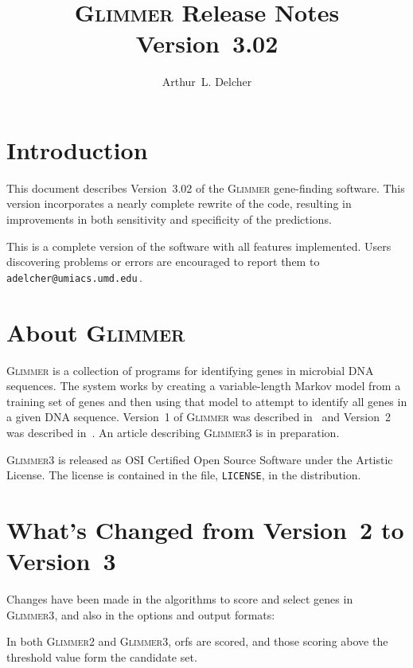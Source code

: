 \documentclass[fleqn,titlepage,11pt]{article}
\def\Glimmer{\textsc{Glimmer}}
\def\Gtwo{\textsc{Glimmer2}}
\def\Gthree{\textsc{Glimmer3}}
\def\Pg#1{\texttt{#1}}
\begin{document}
\RaggedRight
\sloppy

\title{\Glimmer{} Release Notes \\ Version~3.02}
\author{Arthur~L. Delcher}

\maketitle


\section{Introduction}

This document describes Version~3.02 of the \Glimmer{}
gene-finding software.  This version incorporates
a nearly complete rewrite of the code, resulting in
improvements in both sensitivity and specificity of
the predictions.

This is a complete version of the software with
all features implemented.  Users discovering
problems or errors are encouraged to report them to
\,\verb`adelcher@umiacs.umd.edu`\,.


\section{About \Glimmer{}}

\Glimmer{} is a collection of programs for identifying genes in
microbial DNA sequences.  The system works by creating a
variable-length Markov model from a training set of genes and
then using that model to attempt to identify all genes in a
given DNA sequence.  Version~1 of \Glimmer{} was described
in~\cite{glimmer1} and Version~2 was described
in~\cite{glimmer2}.  An article describing \Gthree{} is
in preparation.

\Gthree{} is released as OSI Certified Open Source Software
under the Artistic License.  The license is contained in the
file, \Pg{LICENSE}, in the distribution.


\section{What's Changed from Version~2 to Version~3}

Changes have been made in the algorithms to
score and select genes in \Gthree, and also in the
options and output formats:
\bn\RaggedRight
\item
  In both \Gtwo{} and \Gthree{}, orfs are scored, and those scoring
  above the threshold value form the candidate set.
\end{document}
